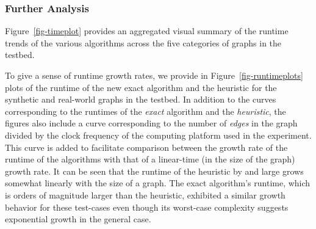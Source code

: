 \subsubsection{Further Analysis}
\label{sec:exp-further}

Figure~\ref{fig-timeplot} provides an aggregated visual summary of the runtime trends of
the various algorithms across the five categories of graphs in the testbed. 


To give a sense of runtime growth rates, we provide in Figure~\ref{fig-runtimeplots} plots of the 
runtime of the new exact algorithm and the heuristic for the synthetic and real-world graphs 
in the testbed. In addition to the curves corresponding to the runtimes of the
{\em exact} algorithm and the {\em heuristic}, the figures also include a curve corresponding to
the number of {\em edges} in the graph divided by the clock frequency of the computing
platform used in the experiment. This curve is added to facilitate comparison between
the growth rate of the runtime of the algorithms with that of a linear-time (in the size of the graph) growth rate. 
It can be seen that the runtime of the heuristic by and large grows 
somewhat linearly with the size of a graph. The exact algorithm's runtime, which is orders of
magnitude larger than the heuristic, exhibited a similar growth behavior for these test-cases
even though its worst-case complexity suggests exponential growth in the general case. 


